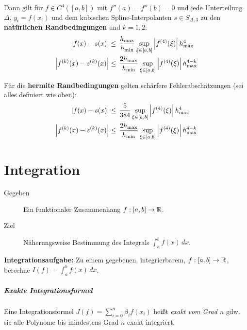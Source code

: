 				Dann gilt für \( f \in C^4([a, b]) \) mit \( f''(a) = f''(b) = 0 \) und jede Unterteilung \( \Delta \), \( y_i = f(x_i) \) und dem kubischen Spline-Interpolanten \( s \in S_{\Delta, 3} \) zu den \textbf{natürlichen Randbedingungen} und \( k = 1, 2 \):
				\begin{align*}
					\abs{f(x) - s(x)}             & \leq\, \frac{h_\textrm{max}}{h_\textrm{min}} \sup_{\xi \in [a, b]} \abs{f^{(4)}(\xi)} \, h_\textrm{max}^4         \\
					\abs{f^{(k)}(x) - s^{(k)}(x)} & \leq\, \frac{2 h_\textrm{max}}{h_\textrm{min}} \sup_{\xi \in [a, b]} \abs{f^{(4)}(\xi)} \, h_\textrm{max}^{4 - k}
				\end{align*}
				
				Für die \textbf{hermite Randbedingungen} gelten schärfere Fehlerabschätzungen (sei alles definiert wie oben):
				\begin{align*}
					\abs{f(x) - s(x)} &\leq\, \frac{5}{384} \sup_{\xi \in [a, b]} \abs{f^{(4)}(\xi)} \, h_\textrm{max}^4 \\
					\abs{f^{(k)}(x) - s^{(k)}(x)} &\leq\, \frac{2 h_\textrm{max}}{h_\textrm{min}} \sup_{\xi \in [a, b]} \abs{f^{(4)}(\xi)} \, h_\textrm{max}^{4 - k}
				\end{align*}

\chapter{Integration}
	\label{c:integration}
	
	\begin{description}
		\item[Gegeben] Ein funktionaler Zusammenhang \( f : [a, b] \rightarrow \mathbb{R} \).
		\item[Ziel] Näherungsweise Bestimmung des Integrals \( \int_{a}^{b} \! f(x) \, dx \).
	\end{description}
	\textbf{Integrationsaufgabe:} Zu einem gegebenen, integrierbarem, \( f : [a, b] \rightarrow \mathbb{R} \), berechne \( I(f) = \int_{a}^{b} \! f(x) \, dx \).
	
	\paragraph{Exakte Integrationsformel}
		Eine Integrationsformel \( J(f) = \sum_{i = 0}^{n} \beta_i f(x_i) \) heißt \textit{exakt vom Grad \(n\)} gdw. sie alle Polynome bis mindestens Grad \(n\) exakt integriert.

